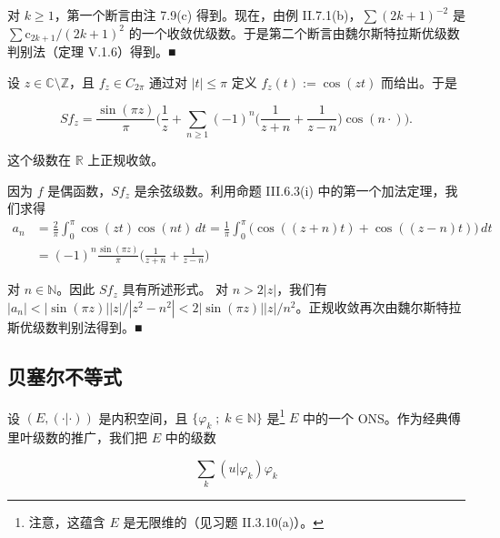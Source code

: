 \begin{example}
对 $ k \ge 1 $，第一个断言由注 7.9(c) 得到。现在，由例 II.7.1(b)，$ \sum (2k+1)^{-2} $ 是 $ \sum \mathrm{c}_{2k+1}/(2k+1)^{2} $ 的一个收敛优级数。于是第二个断言由魏尔斯特拉斯优级数判别法（定理 V.1.6）得到。\nobreak\hspace{0.35em}■

\begin{items}
\item[（c）]

设 $ z \in \mathbb{C} \setminus \mathbb{Z} $，且 $ f_{z} \in C_{2\pi} $ 通过对 $ |t| \le \pi $ 定义 $ f_{z}(t) := \cos(zt) $ 而给出。于是

\[
Sf_{z} = \frac{\sin(\pi z)}{\pi}\Big(\frac{1}{z} + \sum_{n \ge 1}(-1)^{n}\Big(\frac{1}{z+n} + \frac{1}{z-n}\Big)\cos(n\cdot)\Big) .
\]

这个级数在 $ \mathbb{R} $ 上正规收敛。

\proofhead
因为 $ f $ 是偶函数，$ Sf_{z} $ 是余弦级数。利用命题 III.6.3(i) 中的第一个加法定理，我们求得
\begin{equation*}
\begin{aligned}
a_{n} &= \frac{2}{\pi}\int_{0}^{\pi}\cos(zt)\cos(nt) \, dt = \frac{1}{\pi}\int_{0}^{\pi}\big(\cos((z+n)t) + \cos((z-n)t)\big) \, dt \\ &= (-1)^{n}\frac{\sin(\pi z)}{\pi}\Big(\frac{1}{z+n} + \frac{1}{z-n}\Big)
\end{aligned}
\end{equation*}

对 $ n \in \mathbb{N} $。因此 $ Sf_{z} $ 具有所述形式。
对 $ n > 2|z| $，我们有 $ |a_{n}| < |\sin(\pi z)||z|/|z^{2} - n^{2}| < 2|\sin(\pi z)||z|/n^{2} $。正规收敛再次由魏尔斯特拉斯优级数判别法得到。\nobreak\hspace{0.35em}■

\end{items}

\end{example}

\subsection*{贝塞尔不等式}

设 $ (E, (\cdot|\cdot)) $ 是内积空间，且 $ \{ \varphi_{k} \;;\; k \in \mathbb{N} \} $ 是\footnote{注意，这蕴含 $ E $ 是无限维的（见习题 II.3.10(a)）。} $ E $ 中的一个 ONS。作为经典傅里叶级数的推广，我们把 $ E $ 中的级数

\[
\sum_{k}(u|\varphi_{k})\varphi_{k}
\]


